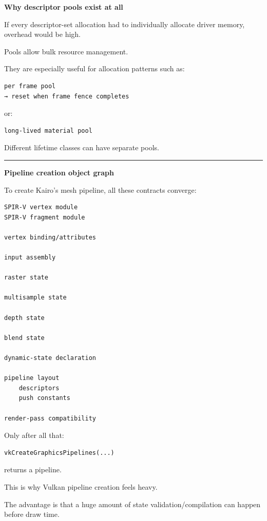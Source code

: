 \textbf{Why descriptor pools exist at all}

If every descriptor-set allocation had to individually allocate driver memory, overhead would be high.

Pools allow bulk resource management.

They are especially useful for allocation patterns such as:

\begin{verbatim}
per frame pool
→ reset when frame fence completes
\end{verbatim}

or:

\begin{verbatim}
long-lived material pool
\end{verbatim}

Different lifetime classes can have separate pools.

\begin{center}\rule{0.5\linewidth}{0.5pt}\end{center}

\textbf{Pipeline creation object graph}

To create Kairo's mesh pipeline, all these contracts converge:

\protect{}\label{p11-pso-graph}%
\begin{verbatim}
SPIR-V vertex module
SPIR-V fragment module

vertex binding/attributes

input assembly

raster state

multisample state

depth state

blend state

dynamic-state declaration

pipeline layout
    descriptors
    push constants

render-pass compatibility
\end{verbatim}

Only after all that:

\begin{verbatim}
vkCreateGraphicsPipelines(...)
\end{verbatim}

returns a pipeline.

This is why Vulkan pipeline creation feels heavy.

The advantage is that a huge amount of state validation/compilation can happen before draw time.

